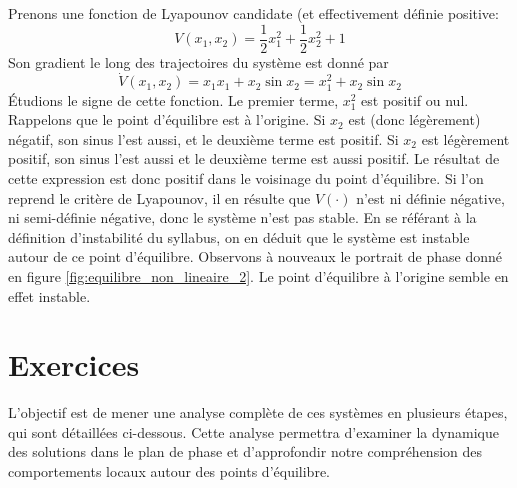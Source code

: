             Prenons une fonction de Lyapounov candidate (et effectivement définie positive:
            \begin{equation}
                V(x_1, x_2) = \frac12 x_1^2 + \frac12 x_2^2 + 1
            \end{equation}
            Son gradient le long des trajectoires du système est donné par 
            \begin{equation}
                \dot V(x_1, x_2) = x_1x_1 + x_2\sin x_2 = x_1^2 + x_2\sin x_2
            \end{equation}
            Étudions le signe de cette fonction. Le premier terme, $x_1^2$ est positif ou nul. Rappelons que le point d'équilibre est à l'origine. Si $x_2$ est (donc légèrement) négatif, son sinus l'est aussi, et le deuxième terme est positif. Si $x_2$ est légèrement positif, son sinus l'est aussi et le deuxième terme est aussi positif. Le résultat de cette expression est donc positif dans le voisinage du point d'équilibre. Si l'on reprend le critère de Lyapounov, il en résulte que $V(\cdot)$ n'est ni définie négative, ni semi-définie négative, donc le système n'est pas stable. En se référant à la définition d'instabilité du syllabus, on en déduit que le système est instable autour de ce point d'équilibre. Observons à nouveaux le portrait de phase donné en figure \ref{fig:equilibre_non_lineaire_2}. Le point d'équilibre à l'origine semble en effet instable.
            
    \section{Exercices}
        L’objectif est de mener une analyse complète de ces systèmes en plusieurs étapes, qui sont détaillées ci-dessous. Cette analyse permettra d’examiner la dynamique des solutions dans le plan de phase et d’approfondir notre compréhension des comportements locaux autour des points d'équilibre.
    
